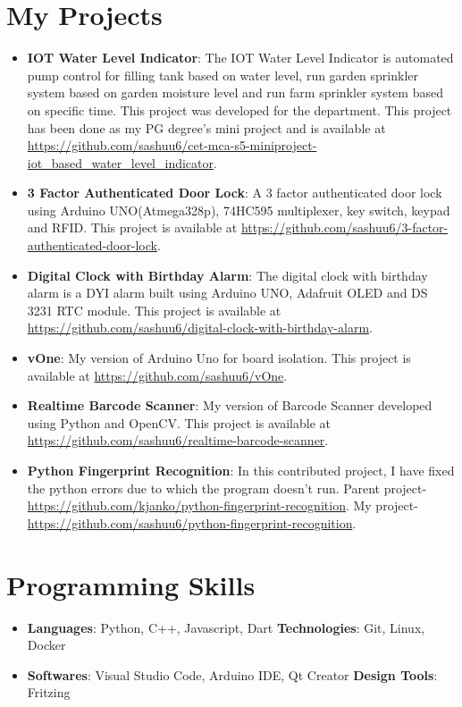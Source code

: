 \documentclass[letterpaper,11pt]{article}
\newcommand{\resumeItem}[2]{
	\item\small{
    		\textbf{#1}{: #2 \vspace{-2pt}}
  	}
}
\newcommand{\resumeSubItem}[2]{\resumeItem{#1}{#2}\vspace{-4pt}}
\newcommand{\resumeSubHeadingListStart}{\begin{itemize}[leftmargin=*]}
\newcommand{\resumeSubHeadingListEnd}{\end{itemize}}
\begin{document}
\section{My Projects}
  	\resumeSubHeadingListStart
		\resumeSubItem{IOT Water Level Indicator}
      			{ The IOT Water Level Indicator is automated pump control for filling tank based on water level, run garden sprinkler system based on garden moisture level and run farm sprinkler system based on specific time. This project was developed for the department. This project has been done as my PG degree's mini project and  is available at \url{https://github.com/sashuu6/cet-mca-s5-miniproject-iot_based_water_level_indicator}.}
    		\resumeSubItem{3 Factor Authenticated Door Lock}
      			{ A 3 factor authenticated door lock using Arduino UNO(Atmega328p), 74HC595 multiplexer, key switch, keypad and RFID. This project is available at \url{https://github.com/sashuu6/3-factor-authenticated-door-lock}.}
    		\resumeSubItem{Digital Clock with Birthday Alarm}
      			{The digital clock with birthday alarm is a DYI alarm built using Arduino UNO, Adafruit OLED and DS 3231 RTC module. This project is available at \url{https://github.com/sashuu6/digital-clock-with-birthday-alarm}.}
      		\resumeSubItem{vOne}
      			{My version of Arduino Uno for board isolation. This project is available at \url{https://github.com/sashuu6/vOne}.}
       		\resumeSubItem{Realtime Barcode Scanner}
      			{My version of Barcode Scanner developed using Python and OpenCV. This project is available at \url{https://github.com/sashuu6/realtime-barcode-scanner}.}
		\resumeSubItem{Python Fingerprint Recognition}
			{In this contributed project, I have fixed the python errors due to which the program doesn't run. Parent project-\url{https://github.com/kjanko/python-fingerprint-recognition}. My project-\url{https://github.com/sashuu6/python-fingerprint-recognition}.}
  	\resumeSubHeadingListEnd

  
\section{Programming Skills}
  	\resumeSubHeadingListStart
    		\item{
      			\textbf{Languages}{: Python, C++,  Javascript, Dart}
      			\hfill
      			\textbf{Technologies}{: Git, Linux, Docker}
    		}
		\item{
      			\textbf{Softwares}{: Visual Studio Code, Arduino IDE, Qt Creator}
      			\hfill
      			\textbf{Design Tools}{: Fritzing}
    		}
  	\resumeSubHeadingListEnd

\end{document}
